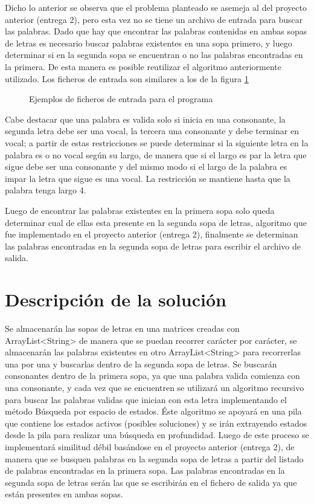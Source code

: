 \documentclass[letterpaper,12pt]{report}
\begin{document}
Dicho lo anterior se observa que el problema planteado se asemeja al del proyecto anterior (entrega 2), pero esta vez no se tiene un archivo de entrada para buscar las palabras. Dado que hay que encontrar las palabras contenidas en ambas sopas de letras es necesario buscar palabras existentes en una sopa primero, y luego determinar si en la segunda sopa se encuentran o no las palabras encontradas en la primera. De esta manera es posible reutilizar el algoritmo anteriormente utilizado. Los ficheros de entrada son similares a los de la figura \ref{fig:ficherosEntrada}

\begin{figure}[h]
 \centering
 \caption{Ejemplos de ficheros de entrada para el programa}
 \label{fig:ficherosEntrada}
\end{figure}

Cabe destacar que una palabra es valida solo si inicia en una consonante, la segunda letra debe ser una vocal, la tercera una consonante y debe terminar en vocal; a partir de estas restricciones se puede determinar si la siguiente letra en la palabra es o no vocal según su largo, de manera que si el largo es par la letra que sigue debe ser una consonante y del mismo modo si el largo de la palabra es impar la letra que sigue es una vocal. La restricción se mantiene hasta que la palabra tenga largo 4.

Luego de encontrar las palabras existentes en la primera sopa solo queda determinar cual de ellas esta presente en la segunda sopa de letras, algoritmo que fue implementado en el proyecto anterior (entrega 2), finalmente se determinan las palabras encontradas en la segunda sopa de letras para escribir el archivo de salida.

\chapter{Descripci\'on de la soluci\'on}

Se almacenarán las sopas de letras en una matrices creadas con ArrayList<String> de manera que se puedan recorrer carácter por carácter, se almacenarán las palabras existentes en otro ArrayList<String> para recorrerlas una por una y buscarlas dentro de la segunda sopa de letras. Se buscarán consonantes dentro de la primera sopa, ya que una palabra valida comienza con una consonante, y cada vez que se encuentren se utilizará un algoritmo recursivo para buscar las palabras validas que inician con esta letra implementando el método Búsqueda por espacio de estados. Éste algoritmo se apoyará en una pila que contiene los estados activos (posibles soluciones) y se irán extrayendo estados desde la pila para realizar una búsqueda en profundidad. Luego de este proceso se implementará similitud débil basándose en el proyecto anterior (entrega 2), de manera que se busquen palabras en la segunda sopa de letras a partir del listado de palabras encontradas en la primera sopa. Las palabras encontradas en la segunda sopa de letras serán las que se escribirán en el fichero de salida ya que están presentes en ambas sopas.
	
\end{document}
